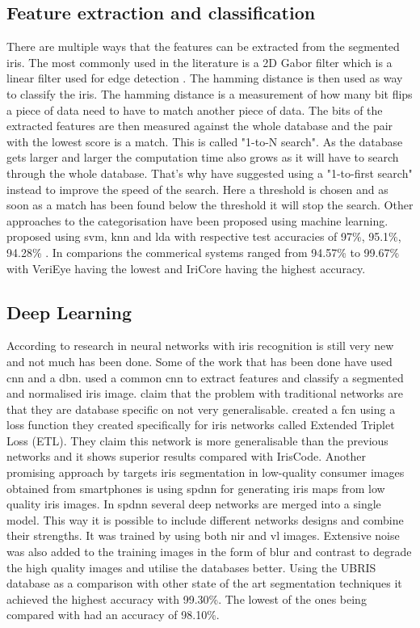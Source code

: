 \subsection{Feature extraction and classification}
There are multiple ways that the features can be extracted from the segmented iris. The most commonly used in the literature is a 2D Gabor filter which is a linear filter used for edge detection \citep{Daugman1993}. The hamming distance is then used as way to classify the iris. The hamming distance is a measurement of how many bit flips a piece of data need to have to match another piece of data. The bits of the extracted features are then measured against the whole database and the pair with the lowest score is a match. This is called "1-to-N search". As the database gets larger and larger the computation time also grows as it will have to search through the whole database. That's why \cite{Kuehlkamp2016} have suggested using a "1-to-first search" instead to improve the speed of the search. Here a threshold is chosen and as soon as a match has been found below the threshold it will stop the search. Other approaches to the categorisation have been proposed using machine learning. \cite{Khan2017} proposed using \gls{svm}, \gls{knn} and \gls{lda} with respective test accuracies of 97\%, 95.1\%, 94.28\% . In comparions the  commerical systems ranged from 94.57\% to  99.67\% with VeriEye having the lowest and IriCore having the highest accuracy. 

\subsection{Deep Learning}
According to \cite{Zhao2017} research in neural networks with iris recognition is still very new and not much has been done. Some of the work that has been done have used \gls{cnn} and a \gls{dbn}. \cite{Al-Waisy2017} used a common \gls{cnn} to extract features and classify a segmented and normalised iris image. \cite{Zhao2017} claim that the problem with traditional networks are that they are database specific on not very generalisable. \cite{Zhao2017} created a \gls{fcn} using a loss function they created specifically for iris networks called Extended Triplet Loss (ETL). They claim this network is more generalisable than the previous networks and it shows superior results compared with IrisCode. Another promising approach by \citep{Bazrafkan2017} targets iris segmentation in low-quality consumer images obtained from smartphones is using \gls{spdnn} for generating iris maps from low quality iris images.  In \gls{spdnn} several deep networks are merged into a single model. This way it is possible to include different networks designs and combine their strengths. It was trained by using both \gls{nir} and \gls{vl} images. Extensive noise was also added to the training images in the form of blur and contrast to degrade the high quality images and utilise the databases better. Using the UBRIS database as a comparison with other state of the art segmentation techniques it achieved the highest accuracy with 99.30\%. The lowest of the ones being compared with had an accuracy of 98.10\%.   






